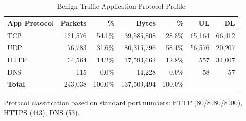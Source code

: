 \begin{table}[htbp]
\centering
\caption{Benign Traffic Application Protocol Profile}\label{tab:benign_app_proto}
\begin{tabular}{lrrrrrr}
\toprule
\textbf{App Protocol} & \textbf{Packets} & \textbf{\%} & \textbf{Bytes} & \textbf{\%} & \textbf{UL} & \textbf{DL} \\
\midrule
TCP & 131,576 & 54.1\% & 39,585,808 & 28.8\% & 65,164 & 66,412 \\
UDP & 76,783 & 31.6\% & 80,315,796 & 58.4\% & 56,576 & 20,207 \\
HTTP & 34,564 & 14.2\% & 17,593,662 & 12.8\% & 557 & 34,007 \\
DNS & 115 & 0.0\% & 14,228 & 0.0\% & 58 & 57 \\
\midrule
\textbf{Total} & 243,038 & 100.0\% & 137,509,494 & 100.0\% & & \\
\bottomrule
\end{tabular}
\vspace{2mm}
\footnotesize{Protocol classification based on standard port numbers: HTTP (80/8080/8000), HTTPS (443), DNS (53).}
\end{table}
